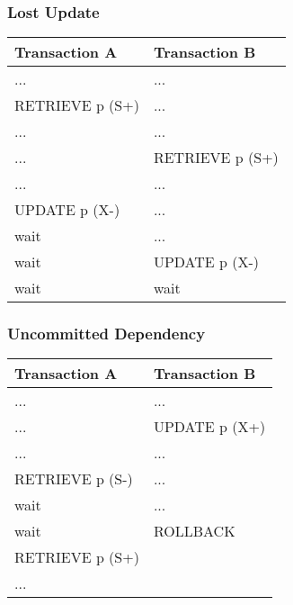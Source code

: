 \documentclass[dvipsnames]{beamer}
\theoremstyle{plain}
\begin{document}
\begin{frame}[fragile]
  \frametitle{Lost Update}

  \begin{example}
    \begin{table}
      \begin{tabular}{ll}
Transaction A   & Transaction B  \\\hline
...             & ...            \\\pause
RETRIEVE p (S+) & ...            \\\pause
...             & ...            \\
...             & RETRIEVE p (S+)\\\pause
...             & ...            \\
UPDATE p (X-)   & ...            \\
wait            & ...            \\\pause
wait            & UPDATE p (X-)  \\
wait            & wait
      \end{tabular}
    \end{table}
  \end{example}
\end{frame}

\begin{frame}[fragile]
  \frametitle{Uncommitted Dependency}

  \begin{example}
    \begin{table}
      \begin{tabular}{ll}
Transaction A   & Transaction B\\\hline
...             & ...          \\\pause
...             & UPDATE p (X+)\\\pause
...             & ...          \\
RETRIEVE p (S-) & ...          \\
wait            & ...          \\\pause
wait            & ROLLBACK     \\
RETRIEVE p (S+) &              \\
...             &
      \end{tabular}
    \end{table}
  \end{example}
\end{frame}
\end{document}
